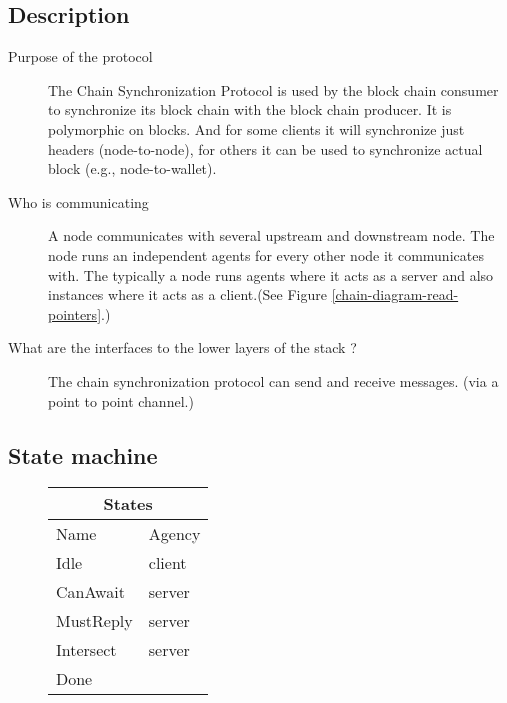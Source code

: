 \documentclass{report}
\theoremstyle{definition}{
  \newtheorem{lemma}{Lemma}[section] %
  \newtheorem{definition}[lemma]{Definition}
}
\theoremstyle{theorem}{
  \newtheorem{invariant}[lemma]{Invariant}
  \newtheorem{proofobligation}[lemma]{Proof Obligation}
}
\numberwithin{equation}{lemma}
\begin{document}
\subsection{Description}
\begin{description}
\item[Purpose of the protocol]

The Chain Synchronization Protocol is used by the block chain consumer
to synchronize its block chain with the block chain producer.
It is polymorphic on blocks. And for some clients it will synchronize just headers (node-to-node),
for others it can be used to synchronize actual block (e.g., node-to-wallet).

\item[Who is communicating]
  A node communicates with several upstream and downstream node.
  The node runs an independent agents for every other node
  it communicates with. The typically a node runs agents where it acts as a server and also instances
  where it acts as a client.(See Figure \ref{chain-diagram-read-pointers}.)
\item[What are the interfaces to the lower layers of the stack ?]
  The chain synchronization protocol can send and receive messages. (via a point to point channel.)
\end{description}

\subsection{State machine}
\begin{figure}[H]
\begin{tabular}{|l|l|}
  \hline
  \multicolumn{2}{|c|}{States} \\ \hline
  Name  & Agency \\ \hline \hline
  Idle       & client \\ \hline
  CanAwait   & server \\ \hline
  MustReply  & server \\ \hline
  Intersect  & server \\ \hline
  Done       &        \\ \hline
  \hline
\end{tabular}
\end{figure}
\end{document}
